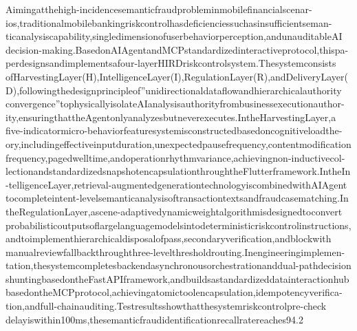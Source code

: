 Aimingatthehigh-incidencesemanticfraudprobleminmobilefinancialscenar-ios,traditionalmobilebankingriskcontrolhasdeficienciessuchasinsufficientseman-ticanalysiscapability,singledimensionofuserbehaviorperception,andunauditableAI decision-making.BasedonAIAgentandMCPstandardizedinteractiveprotocol,thispa-perdesignsandimplementsafour-layerHIRDriskcontrolsystem.Thesystemconsists ofHarvestingLayer(H),IntelligenceLayer(I),RegulationLayer(R),andDeliveryLayer(D),followingthedesignprincipleof”unidirectionaldataflowandhierarchicalauthority convergence”tophysicallyisolateAIanalysisauthorityfrombusinessexecutionauthor-ity,ensuringthattheAgentonlyanalyzesbutneverexecutes.IntheHarvestingLayer,a five-indicatormicro-behaviorfeaturesystemisconstructedbasedoncognitiveloadthe-ory,includingeffectiveinputduration,unexpectedpausefrequency,contentmodification frequency,pagedwelltime,andoperationrhythmvariance,achievingnon-inductivecol-lectionandstandardizedsnapshotencapsulationthroughtheFlutterframework.IntheIn-telligenceLayer,retrieval-augmentedgenerationtechnologyiscombinedwithAIAgent tocompleteintent-levelsemanticanalysisoftransactiontextsandfraudcasematching.In theRegulationLayer,ascene-adaptivedynamicweightalgorithmisdesignedtoconvert probabilisticoutputsoflargelanguagemodelsintodeterministicriskcontrolinstructions,andtoimplementhierarchicaldisposalofpass,secondaryverification,andblockwith manualreviewfallbackthroughthree-levelthresholdrouting.Inengineeringimplemen-tation,thesystemcompletesbackendasynchronousorchestrationanddual-pathdecision shuntingbasedontheFastAPIframework,andbuildsastandardizeddatainteractionhub basedontheMCPprotocol,achievingatomictoolencapsulation,idempotencyverifica-tion,andfull-chainauditing.Testresultsshowthatthesystemriskcontrolpre-check delayiswithin100ms,thesemanticfraudidentificationrecallratereaches94.2